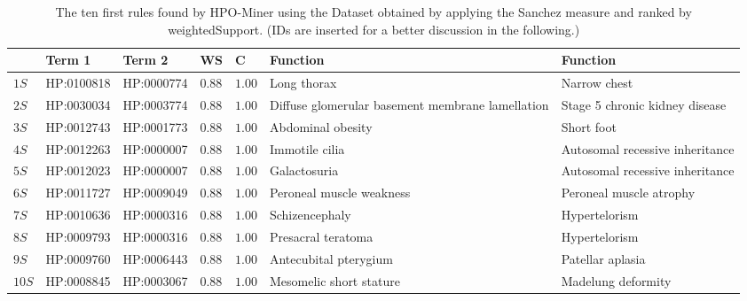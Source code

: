 \documentclass{article}
\theoremstyle{definition}
\begin{document}
\begin{table}[ht]

\caption{The ten first rules found by HPO-Miner using the Dataset obtained by applying the Sanchez measure and ranked by weightedSupport. (IDs are inserted for a better discussion in the following.) }
\label{tab:Sanchez}
\begin{tabular}{|p{0.5cm}|l|l|p{0.5cm}|p{0.5cm}|p{2.2cm}|p{2.2cm}|}
\hline 
\textbf{}&\textbf{Term 1}& \textbf{Term 2} & \textbf{WS} & \textbf{C} &\textbf{Function} & \textbf{Function }\\ 
\hline
$1S$&HP:0100818&HP:0000774&$0.88$&$1.00$& Long thorax&Narrow chest\\
\hline
$2S$&HP:0030034&HP:0003774&$0.88$&$1.00$&Diffuse glomerular basement membrane lamellation&Stage 5 chronic kidney disease\\
 \hline
$3S$&HP:0012743	&HP:0001773&$0.88$&$1.00$&Abdominal obesity&Short foot\\ 
 \hline
$4S$&HP:0012263&HP:0000007&$0.88$&$1.00$&Immotile cilia&Autosomal recessive inheritance\\
 \hline
$5S$&HP:0012023&HP:0000007&$0.88$&$1.00$&Galactosuria&Autosomal recessive inheritance\\ 
 \hline
$6S$&HP:0011727&HP:0009049&$0.88$&$1.00$&Peroneal muscle weakness&Peroneal muscle atrophy\\
 \hline
$7S$&HP:0010636&HP:0000316&$0.88$&$1.00$&Schizencephaly&Hypertelorism\\
 \hline
$8S$&HP:0009793&HP:0000316&$0.88$&$1.00$& Presacral teratoma&Hypertelorism\\
 \hline
$9S$&HP:0009760&HP:0006443&$0.88$&$1.00$&Antecubital pterygium&Patellar aplasia\\
 \hline
$10S$&HP:0008845&HP:0003067&$0.88$&$1.00$&Mesomelic short stature&Madelung deformity\\
\hline
\end{tabular}
\end{table}
\end{document}
